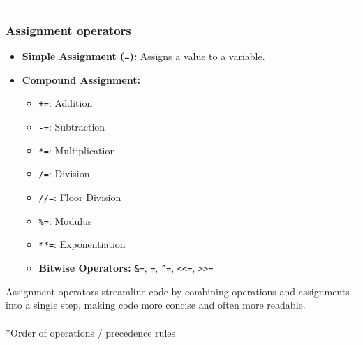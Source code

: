 \documentclass[
  letterpaper,
  DIV=11,
  numbers=noendperiod]{scrreprt}
\makeatletter
\let\oldparagraph\paragraph
\renewcommand{\paragraph}{
    \@ifstar
      \xxxParagraphStar
      \xxxParagraphNoStar
  }
\newcommand{\xxxParagraphStar}[1]{\oldparagraph*{#1}\mbox{}}
\newcommand{\xxxParagraphNoStar}[1]{\oldparagraph{#1}\mbox{}}
\providecommand{\tightlist}{%
  \setlength{\itemsep}{0pt}\setlength{\parskip}{0pt}}
\makeatother
\begin{document}
\begin{center}\rule{0.5\linewidth}{0.5pt}\end{center}

\subsubsection*{Assignment operators}\label{assignment-operators}

\begin{itemize}
\tightlist
\item
  \textbf{Simple Assignment (}\texttt{=}\textbf{):} Assigns a value to a
  variable.
\item
  \textbf{Compound Assignment:}

  \begin{itemize}
  \tightlist
  \item
    \texttt{+=}: Addition
  \item
    \texttt{-=}: Subtraction
  \item
    \texttt{*=}: Multiplication
  \item
    \texttt{/=}: Division
  \item
    \texttt{//=}: Floor Division
  \item
    \texttt{\%=}: Modulus
  \item
    \texttt{**=}: Exponentiation
  \item
    \textbf{Bitwise Operators:} \texttt{\&=}, \texttt{\textbar{}=},
    \texttt{\^{}=}, \texttt{\textless{}\textless{}=},
    \texttt{\textgreater{}\textgreater{}=}
  \end{itemize}
\end{itemize}

Assignment operators streamline code by combining operations and
assignments into a single step, making code more concise and often more
readable.

\paragraph*{Order of operations / precedence
rules}\label{order-of-operations-precedence-rules}
\end{document}
